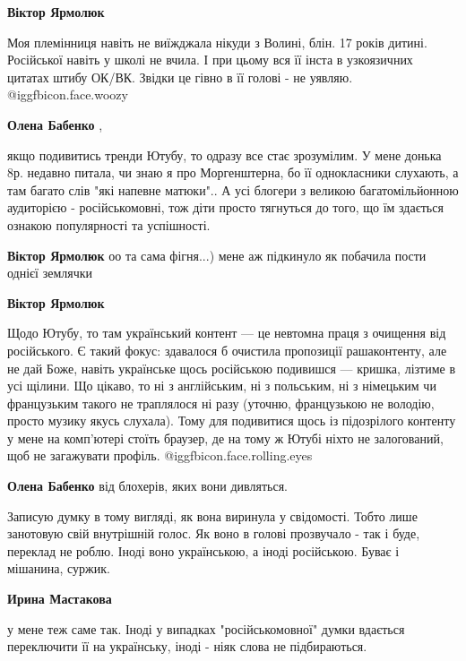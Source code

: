 \begin{itemize}
\begin{itemize}
\textbf{Віктор Ярмолюк} 

Моя племінниця навіть не виїжджала нікуди з Волині, блін. 17 років дитині.
Російської навіть у школі не вчила. І при цьому вся її інста в узкоязичних
цитатах штибу ОК/ВК. Звідки це гівно в її голові - не уявляю.  @igg{fbicon.face.woozy} 

\textbf{Олена Бабенко} , 

якщо подивитись тренди Ютубу, то одразу все стає зрозумілим. У мене донька 8р.
недавно питала, чи знаю я про Моргенштерна, бо її однокласники слухають, а там
багато слів "які напевне матюки".. А усі блогери з великою багатомільйонною
аудиторією - російськомовні, тож діти просто тягнуться до того, що їм здається
ознакою популярності та успішності.

\textbf{Віктор Ярмолюк} оо та сама фігня...) мене аж підкинуло як побачила пости однієї землячки

\textbf{Віктор Ярмолюк} 

Щодо Ютубу, то там український контент — це невтомна праця з очищення від
російського. Є такий фокус: здавалося б очистила пропозиції рашаконтенту, але
не дай Боже, навіть українське щось російською подивишся — кришка, лізтиме в
усі щілини. Що цікаво, то ні з англійським, ні з польським, ні з німецьким чи
французьким такого не траплялося ні разу (уточню, французькою не володію,
просто музику якусь слухала). Тому для подивитися щось із підозрілого контенту
у мене на комп'ютері стоїть браузер, де на тому ж Ютубі ніхто не залогований,
щоб не загажувати профіль.  @igg{fbicon.face.rolling.eyes} 


\textbf{Олена Бабенко} від блохерів, яких вони дивляться.

\end{itemize} %


Записую думку в тому вигляді, як вона виринула у свідомості. Тобто лише
занотовую свій внутрішній голос. Як воно в голові прозвучало - так і буде,
переклад не роблю. Іноді воно українською, а іноді російською. Буває і
мішанина, суржик.

\begin{itemize} %
\textbf{Ирина Мастакова} 

у мене теж саме так. Іноді у випадках "російськомовної" думки вдається
переключити її на українську, іноді - ніяк слова не підбираються.


\end{itemize}
\end{itemize}
